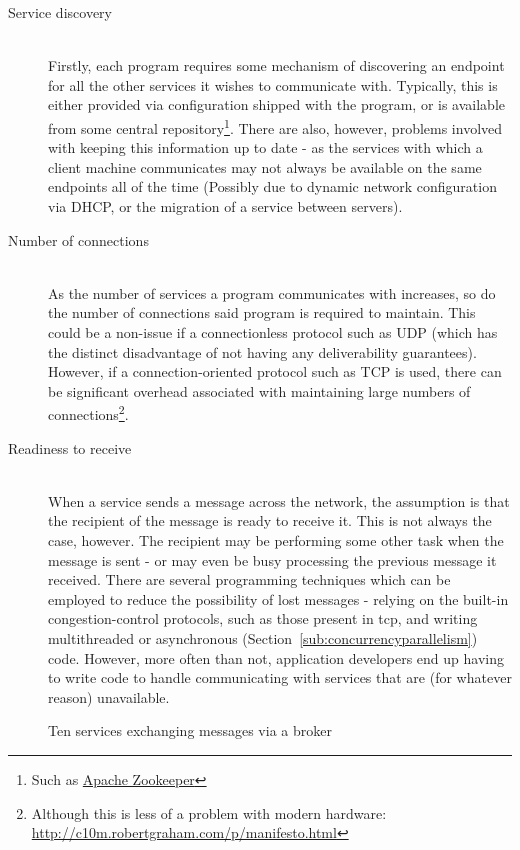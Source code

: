 \begin{description}
  \item[Service discovery] \hfill \\ Firstly, each program requires some
  mechanism of discovering an endpoint for all the other services it wishes to
  communicate with. Typically, this is either provided via configuration shipped
  with the program, or is available from some central repository\footnote{Such
  as \href{https://zookeeper.apache.org/}{Apache Zookeeper}}. There are also,
  however, problems involved with keeping this information up to date - as the
  services with which a client machine communicates may not always be available
  on the same endpoints all of the time (Possibly due to dynamic network
  configuration via DHCP, or the migration of a service between servers).
  \item[Number of connections] \hfill \\
  As the number of services a program communicates with increases, so do the
  number of connections said program is required to maintain. This could be a
  non-issue if a connectionless protocol such as UDP (which has the distinct
  disadvantage of not having any deliverability guarantees). However, if a
  connection-oriented protocol such as TCP is used, there can be significant
  overhead associated with maintaining large numbers of
  connections\footnote{Although this is less of a problem with modern hardware:
  \url{http://c10m.robertgraham.com/p/manifesto.html}}.
  \item[Readiness to receive] \hfill \\ When a service sends a message across
  the network, the assumption is that the recipient of the message is ready to
  receive it.  This is not always the case, however. The recipient may be
  performing some other task when the message is sent - or may even be busy
  processing the previous message it received. There are several programming
  techniques which can be employed to reduce the possibility of lost messages -
  relying on  the built-in congestion-control protocols, such as those present
  in \gls{tcp}\cite{rfc2581}, and writing multithreaded or asynchronous
  (Section~\ref{sub:concurrencyparallelism}) code. However, more often than not,
  application developers end up having to write code to handle communicating
  with services that are (for whatever reason) unavailable.
\end{description}

\begin{figure}[ht]
  \centering
  
  \caption{Ten services exchanging messages via a broker}
  \label{fig:tikz:messageBroker}
\end{figure}

